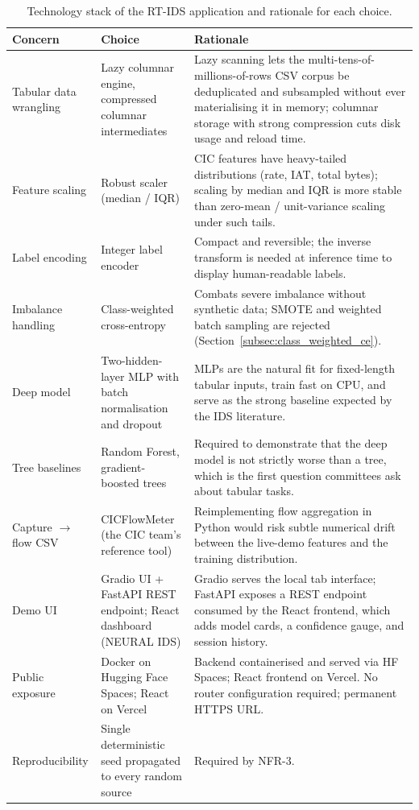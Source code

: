 \begin{table}[htbp]
\begin{center}
\small
\begin{tabular}{|p{70pt}|p{82pt}|p{198pt}|}
\hline
\textbf{Concern} & \textbf{Choice} & \textbf{Rationale} \\
\hline
\hline
Tabular data wrangling & Lazy columnar engine, compressed columnar intermediates & Lazy scanning lets the multi-tens-of-millions-of-rows CSV corpus be deduplicated and subsampled without ever materialising it in memory; columnar storage with strong compression cuts disk usage and reload time. \\
\hline
Feature scaling & Robust scaler (median / IQR) & CIC features have heavy-tailed distributions (rate, IAT, total bytes); scaling by median and IQR is more stable than zero-mean / unit-variance scaling under such tails. \\
\hline
Label encoding & Integer label encoder & Compact and reversible; the inverse transform is needed at inference time to display human-readable labels. \\
\hline
Imbalance handling & Class-weighted cross-entropy & Combats severe imbalance without synthetic data; SMOTE and weighted batch sampling are rejected (Section~\ref{subsec:class_weighted_ce}). \\
\hline
Deep model & Two-hidden-layer MLP with batch normalisation and dropout & MLPs are the natural fit for fixed-length tabular inputs, train fast on CPU, and serve as the strong baseline expected by the IDS literature. \\
\hline
Tree baselines & Random Forest, gradient-boosted trees & Required to demonstrate that the deep model is not strictly worse than a tree, which is the first question committees ask about tabular tasks. \\
\hline
Capture $\to$ flow CSV & CICFlowMeter (the CIC team's reference tool) & Reimplementing flow aggregation in Python would risk subtle numerical drift between the live-demo features and the training distribution. \\
\hline
Demo UI & Gradio UI + FastAPI REST endpoint; React dashboard (NEURAL IDS) & Gradio serves the local tab interface; FastAPI exposes a REST endpoint consumed by the React frontend, which adds model cards, a confidence gauge, and session history. \\
\hline
Public exposure & Docker on Hugging Face Spaces; React on Vercel & Backend containerised and served via HF Spaces; React frontend on Vercel. No router configuration required; permanent HTTPS URL. \\
\hline
Reproducibility & Single deterministic seed propagated to every random source & Required by NFR-3. \\
\hline
\end{tabular}
\end{center}
\caption{Technology stack of the RT-IDS application and rationale for each choice.}
\label{tab:tech_stack}
\end{table}

